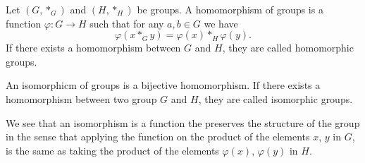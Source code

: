 \documentclass[11pt,a4paper]{article}
\begin{document}
  \begin{definition}
    Let $(G,*_G)$ and $(H,*_H)$ be groups.
    A homomorphism of groups is a function $\varphi \colon G \to H$ such
    that for any $a, b \in G$ we have
    \[
      \varphi(x *_G y) = \varphi(x) *_H \varphi(y).
    \]
    If there exists a homomorphism between $G$ and $H$, they are called
    homomorphic groups.
  \end{definition}

  \begin{definition}
    An isomorphicm of groups is a bijective homomorphism.
    If there exists a homomorphism between two group $G$ and $H$,
    they are called isomorphic groups.
  \end{definition}

  We see that an isomorphism is a function the preserves the structure
  of the group in the sense that applying the function on the product 
  of the elements $x$, $y$ in $G$, is the same as taking the product of 
  the elements $\varphi(x)$, $\varphi(y)$ in $H$.
\end{document}
